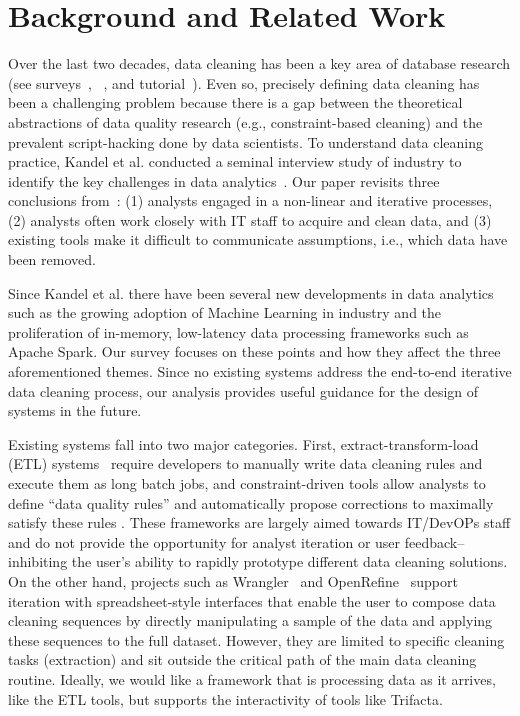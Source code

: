 \section{Background and Related Work}\label{sec:relwork}
Over the last two decades, data cleaning has been a key area of database research (see surveys~\cite{Dasu:2003:EDM:861869}, ~\cite{Rahm00datacleaning}, and tutorial~\cite{chu2016tut}).
Even so, precisely defining data cleaning has been a challenging problem because there is a gap between the theoretical abstractions of data quality research (e.g., constraint-based cleaning) and the prevalent script-hacking done by data scientists.
To understand data cleaning practice, Kandel et al. conducted a seminal interview study of industry to identify the key challenges in data analytics~\cite{kandel2012}. 
Our paper revisits three conclusions from~\cite{kandel2012}: (1) analysts engaged in a non-linear and iterative processes, (2) analysts often work closely with IT staff to acquire and clean data, and (3) existing tools make it difficult to communicate assumptions, i.e., which data have been removed.

Since Kandel et al. there have been several new developments in data analytics such as the growing adoption of Machine Learning in industry and the proliferation of in-memory, low-latency data processing frameworks such as Apache Spark. 
Our survey focuses on these points and how they affect the three aforementioned themes.
Since no existing systems address the end-to-end iterative data cleaning process, our analysis provides useful guidance for the design of systems in the future.

Existing systems fall into two major categories.
First, extract-transform-load (ETL) systems~\cite{informatica,talend,apachefalcon} require developers to manually write data cleaning rules and execute them as long batch jobs, 
and constraint-driven tools allow analysts to define ``data quality rules'' and automatically propose corrections to maximally satisfy these rules \cite{DBLP:conf/sigmod/DallachiesaEEEIOT13}.
These frameworks are largely aimed towards IT/DevOPs staff and do not provide the opportunity for analyst iteration or user feedback-- inhibiting the user's ability to rapidly prototype different data cleaning solutions.
On the other hand, projects such as Wrangler~\cite{wrangler,trifacta} and OpenRefine~\cite{openrefine} support iteration with spreadsheet-style interfaces that enable the user to compose data cleaning sequences by directly manipulating a sample of the data and applying these sequences to the full dataset.
However, they are limited to specific cleaning tasks (extraction) and sit outside the critical path of the main data cleaning routine. 
Ideally, we would like a framework that is processing data as it arrives, like the ETL tools, but supports the interactivity of tools like Trifacta.

